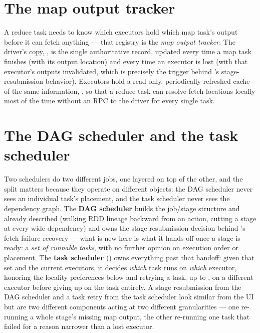 \section{The map output tracker}
\label{sec:sched-map-output-tracker}

A reduce task needs to know which executors hold which map task's output
before it can fetch anything --- that registry is the \emph{map output
tracker}. The driver's copy, , is the single
authoritative record, updated every time a map task finishes (with its
output location) and every time an executor is lost (with that executor's
outputs invalidated, which is precisely the trigger behind
's stage-resubmission behavior). Executors hold
a read-only, periodically-refreshed cache of the same information,
, so that a reduce task can resolve fetch
locations locally most of the time without an RPC to the driver for every
single task.

\section{The DAG scheduler and the task scheduler}
\label{sec:sched-dag-task}

Two schedulers do two different jobs, one layered on top of the other, and
the split matters because they operate on different objects: the DAG
scheduler never sees an individual task's placement, and the task
scheduler never sees the dependency graph. The \textbf{DAG scheduler}
builds the job/stage structure  and 
already described (walking RDD lineage backward from an action, cutting a
stage at every wide dependency) and owns the stage-resubmission decision
behind 's fetch-failure recovery --- what is
new here is what it hands off once a stage is ready: a \emph{set of runnable
tasks}, with no further opinion on execution order or placement. The
\textbf{task scheduler} () owns everything past
that handoff: given that set and the current executors, it decides
\emph{which} task runs on \emph{which} executor, honoring the locality
preferences below and retrying a task, up to ,
on a different executor before giving up on the task entirely. A stage
resubmission from the DAG scheduler and a task retry from the task
scheduler look similar from the UI but are two different components acting
at two different granularities --- one re-running a whole stage's missing
map output, the other re-running one task that failed for a reason
narrower than a lost executor.

